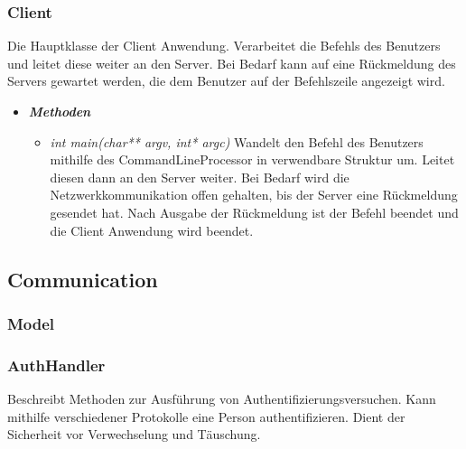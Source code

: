 \documentclass[a4paper,12pt]{article}
\begin{document}
\subsubsection{Client}

Die Hauptklasse der Client Anwendung. Verarbeitet die Befehls des Benutzers und leitet diese weiter an den Server. Bei Bedarf kann auf eine Rückmeldung des Servers gewartet werden, die dem Benutzer auf der Befehlszeile angezeigt wird.

\begin{itemize}[label={}]

	\item \textit{\textbf{Methoden}}
		\begin{itemize}[label={\textbullet}]

			\item \textit{int main(char** argv, int* argc)} Wandelt den Befehl des Benutzers mithilfe des CommandLineProcessor in verwendbare Struktur um. Leitet diesen dann an den Server weiter. Bei Bedarf wird die Netzwerkkommunikation offen gehalten, bis der Server eine Rückmeldung gesendet hat. Nach Ausgabe der Rückmeldung ist der Befehl beendet und die Client Anwendung wird beendet.
			
		\end{itemize}

\end{itemize}

\clearpage


\subsection{Communication}

\subsubsection{Model}



\subsubsection{AuthHandler}

Beschreibt Methoden zur Ausführung von Authentifizierungsversuchen. Kann mithilfe verschiedener Protokolle eine Person authentifizieren. Dient der Sicherheit vor Verwechselung und Täuschung.
\end{document}
